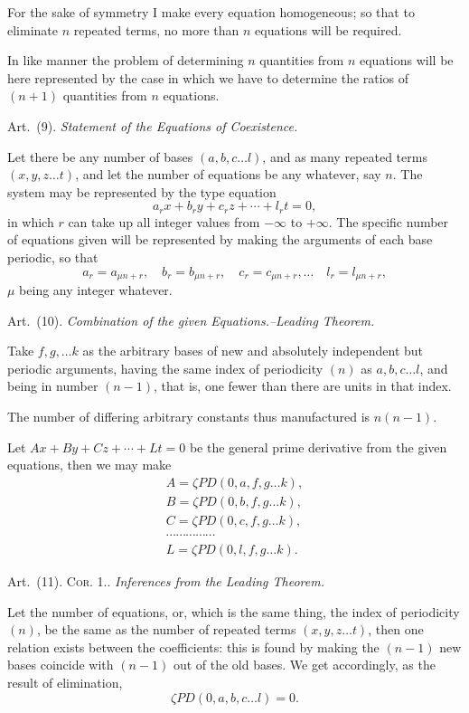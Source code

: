 \documentclass[11pt]{article}
\newcommand{\sourcepage}[1]{\marginpar{\scriptsize p.~#1}}
\newcommand{\corhead}[1]{\textsc{Cor. #1.}}
\newcommand{\art}[1]{\par\smallskip\noindent Art.~(#1).\quad}
\newcommand{\PD}{\mathit{PD}}
\begin{document}
\sourcepage{50}
For the sake of symmetry I make every equation homogeneous; so that to eliminate $n$ repeated terms, no more than $n$ equations will be required.

In like manner the problem of determining $n$ quantities from $n$ equations will be here represented by the case in which we have to determine the ratios of $(n+1)$ quantities from $n$ equations.

\art{9} \emph{Statement of the Equations of Coexistence.}

Let there be any number of bases $(a,b,c\ldots l)$, and as many repeated terms $(x,y,z\ldots t)$, and let the number of equations be any whatever, say $n$. The system may be represented by the type equation
\[
 a_rx+b_ry+c_rz+\cdots+l_rt=0,
\]
in which $r$ can take up all integer values from $-\infty$ to $+\infty$. The specific number of equations given will be represented by making the arguments of each base periodic, so that
\[
 a_r=a_{\mu n+r},\quad b_r=b_{\mu n+r},\quad c_r=c_{\mu n+r},\ldots\quad l_r=l_{\mu n+r},
\]
$\mu$ being any integer whatever.

\art{10} \emph{Combination of the given Equations.--Leading Theorem.}

Take $f,g,\ldots k$ as the arbitrary bases of new and absolutely independent but periodic arguments, having the same index of periodicity $(n)$ as $a,b,c\ldots l$, and being in number $(n-1)$, that is, one fewer than there are units in that index.

The number of differing arbitrary constants thus manufactured is $n(n-1)$.

Let $Ax+By+Cz+\cdots+Lt=0$ be the general prime derivative from the given equations, then we may make
\[
\begin{gathered}
 A=\zeta\PD(0,a,f,g\ldots k),\\
 B=\zeta\PD(0,b,f,g\ldots k),\\
 C=\zeta\PD(0,c,f,g\ldots k),\\
 \cdots\cdots\cdots\cdots\cdots\\
 L=\zeta\PD(0,l,f,g\ldots k).
\end{gathered}
\]

\art{11} \corhead{1.} \emph{Inferences from the Leading Theorem.}

Let the number of equations, or, which is the same thing, the index of periodicity $(n)$, be the same as the number of repeated terms $(x,y,z\ldots t)$, then one relation exists between the coefficients: this is found by making the $(n-1)$ new bases coincide with $(n-1)$ out of the old bases. We get accordingly, as the result of elimination,
\[
 \zeta\PD(0,a,b,c\ldots l)=0.
\]
\end{document}
